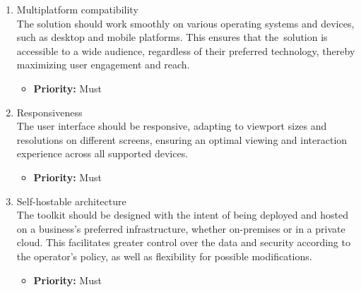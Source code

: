 \begin{enumerate}[label=\textbf{NF\arabic*:}, leftmargin=*]

\item \label{itm:NF1} Multiplatform compatibility
\vspace{2pt}
\\The solution should work smoothly on various operating systems and devices, such as desktop and mobile platforms. This ensures that the~solution is accessible to a wide audience, regardless of their preferred technology, thereby maximizing user engagement and reach.
\begin{itemize}[noitemsep, label=\trianglebullet]
    \item \textbf{Priority:} Must
\end{itemize}
\vspace{4pt}

\item \label{itm:NF2} Responsiveness
\vspace{2pt}
\\The user interface should be responsive, adapting to viewport sizes and resolutions on different screens, ensuring an optimal viewing and interaction experience across all supported devices.
\begin{itemize}[noitemsep, label=\trianglebullet]
    \item \textbf{Priority:} Must
\end{itemize}
\vspace{4pt}

\item \label{itm:NF3} Self-hostable architecture
\vspace{2pt}
\\The toolkit should be designed with the intent of being deployed and hosted on a business's preferred infrastructure, whether on-premises or in a private cloud. This facilitates greater control over the data and security according to the operator's policy, as well as flexibility for possible modifications.
\begin{itemize}[noitemsep, label=\trianglebullet]
    \item \textbf{Priority:} Must
\end{itemize}
\vspace{4pt}


\end{enumerate}
